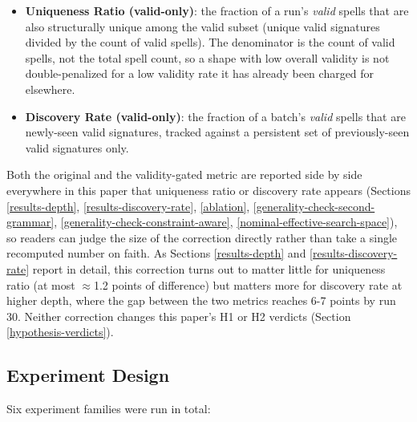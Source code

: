 \documentclass[]{article}
\begin{document}
        \begin{itemize}
            \item 
                \textbf{Uniqueness Ratio (valid-only)}: the fraction of a run's \textit{valid} spells that are also structurally unique among the valid subset (unique valid signatures divided by the count of valid spells). The denominator is the count of valid spells, not the total spell count, so a shape with low overall validity is not double-penalized for a low validity rate it has already been charged for elsewhere.
            \item 
                \textbf{Discovery Rate (valid-only)}: the fraction of a batch's \textit{valid} spells that are newly-seen valid signatures, tracked against a persistent set of previously-seen valid signatures only.
        \end{itemize}
        
        Both the original and the validity-gated metric are reported side by side everywhere in this paper that uniqueness ratio or discovery rate appears (Sections \ref{results-depth}, \ref{results-discovery-rate}, \ref{ablation}, \ref{generality-check-second-grammar}, \ref{generality-check-constraint-aware}, \ref{nominal-effective-search-space}), so readers can judge the size of the correction directly rather than take a single recomputed number on faith. As Sections \ref{results-depth} and \ref{results-discovery-rate} report in detail, this correction turns out to matter little for uniqueness ratio (at most $\approx$1.2 points of difference) but matters more for discovery rate at higher depth, where the gap between the two metrics reaches 6-7 points by run 30. Neither correction changes this paper's H1 or H2 verdicts (Section \ref{hypothesis-verdicts}).

        \subsection{Experiment Design}\label{experiment-design}

        Six experiment families were run in total:
\end{document}

